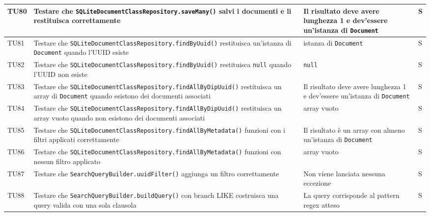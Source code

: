 \documentclass[a4paper,12pt]{article}
\begin{document}
\begin{longtable}{|M{1.2cm}|M{5cm}|M{7cm}|M{1.5cm}|}
            TU80 & Testare che \texttt{SQLiteDocumentClassRepository.saveMany()} salvi i documenti e li restituisca correttamente & Il risultato deve avere lunghezza 1 e dev'essere un'istanza di \texttt{Document} & S \\
            \hline

            TU81 & Testare che \texttt{SQLiteDocumentClassRepository.findByUuid()} restituisca un'istanza di \texttt{Document} quando l'UUID esiste & istanza di \texttt{Document} & S \\
            \hline

            TU82 & Testare che \texttt{SQLiteDocumentClassRepository.findByUuid()} restituisca \texttt{null} quando l'UUID non esiste & \texttt{null} & S \\
            \hline

            TU83 & Testare che \texttt{SQLiteDocumentClassRepository.findAllByDipUuid()} restituisca un array di \texttt{Document} quando esistono dei documenti associati & Il risultato deve avere lunghezza 1 e dev'essere un'istanza di \texttt{Document} & S \\
            \hline

            TU84 & Testare che \texttt{SQLiteDocumentClassRepository.findAllByDipUuid()} restituisca un array vuoto quando non esistono dei documenti associati & array vuoto & S \\
            \hline

            TU85 & Testare che \texttt{SQLiteDocumentClassRepository.findAllByMetadata()} funzioni con i filtri applicati correttamente & Il risultato è un array con almeno un'istanza di \texttt{Document} & S \\
            \hline

            TU86 & Testare che \texttt{SQLiteDocumentClassRepository.findAllByMetadata()} funzioni con nessun filtro applicato & array vuoto & S \\
            \hline

            TU87 & Testare che \texttt{SearchQueryBuilder.uuidFilter()} aggiunga un filtro correttamente & Non viene lanciata nessuna eccezione & S \\
            \hline

            TU88 & Testare che \texttt{SearchQueryBuilder.buildQuery()} con branch LIKE costruisca una query valida con una sola clausola & La query corrisponde al pattern regex atteso & S \\
            \hline


\end{longtable}
\end{document}
